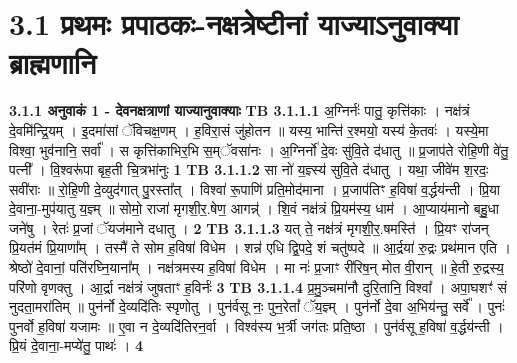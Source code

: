 \documentclass[17pt]{extarticle}
\begin{document}
     \section*{ 3.1     प्रथमः प्रपाठकः-नक्षत्रेष्टीनां याज्याऽनुवाक्या ब्राह्मणानि }
                \textbf{ 3.1.1      अनुवाकं   1 - देवनक्षत्राणां याज्यानुवाक्याः} \newline
                                \textbf{ TB 3.1.1.1} \newline
                  अ॒ग्निर्नः॑ पातु॒ कृत्ति॑काः । नक्ष॑त्रं दे॒वमि॑न्द्रि॒यम् । इ॒दमा॑सां ॅविचक्ष॒णम् । ह॒विरा॒सं जु॑होतन ॥ यस्य॒ भान्ति॑ र॒श्मयो॒ यस्य॑ के॒तवः॑ । यस्ये॒मा विश्वा॒ भुव॑नानि॒ सर्वा᳚ । स कृत्ति॑काभिर॒भि स॒म्ॅवसा॑नः । अ॒ग्निर्नो॑ दे॒वः सु॑वि॒ते द॑धातु ॥ प्र॒जाप॑ते रोहि॒णी वे॑तु॒ पत्नी᳚ । वि॒श्वरू॑पा बृह॒ती चि॒त्रभा॑नुः \textbf{ 1} \newline
                  \newline
                                \textbf{ TB 3.1.1.2} \newline
                  सा नो॑ य॒ज्ञ्स्य॑ सुवि॒ते द॑धातु । यथा॒ जीवे॑म श॒रदः॒ सवी॑राः ॥ रो॒हि॒णी दे॒व्युद॑गात् पु॒रस्ता᳚त् । विश्वा॑ रू॒पाणि॑ प्रति॒मोद॑माना । प्र॒जाप॑तिꣳ ह॒विषा॑ व॒र्द्धय॑न्ती । प्रि॒या दे॒वाना॒-मुप॑यातु य॒ज्ञ्म् ॥ सोमो॒ राजा॑ मृगशी॒र॒.षेण॒ आगन्न्॑ । शि॒वं नक्ष॑त्रं प्रि॒यम॑स्य॒ धाम॑ । आ॒प्याय॑मानो बहु॒॒धा जने॑षु । रेतः॑ प्र॒जां ॅयज॑माने दधातु । \textbf{ 2} \newline
                  \newline
                                \textbf{ TB 3.1.1.3} \newline
                  यत् ते॒ नक्ष॑त्रं मृगशी॒॒र॒.षमस्ति॑ । प्रि॒यꣳ रा॑जन् प्रि॒यत॑मं प्रि॒याणा᳚म् । तस्मै॑ ते सोम ह॒विषा॑ विधेम । शन्न॑ एधि द्वि॒पदे॒ शं चतु॑ष्पदे ॥ आ॒र्द्रया॑ रु॒द्रः प्रथ॑मान एति । श्रेष्ठो॑ दे॒वानां॒ पति॑रघ्नि॒याना᳚म् । नक्ष॑त्रमस्य ह॒विषा॑ विधेम । मा नः॑ प्र॒जाꣳ री॑रिष॒न् मोत वी॒रान् ॥ हे॒ती रु॒द्रस्य॒ परि॑णो वृणक्तु । आ॒र्द्रा नक्ष॑त्रं जुषताꣳ ह॒विर्नः॑ \textbf{ 3} \newline
                  \newline
                                \textbf{ TB 3.1.1.4} \newline
                  प्र॒मु॒ञ्चमा॑नौ दुरि॒तानि॒ विश्वा᳚ । अपा॒घशꣳ॑ सं नुदता॒मरा॑तिम् ॥ पुन॑र्नो दे॒व्यदि॑तिः स्पृणोतु । पुन॑र्वसू नः॒ पुन॒रेतां᳚ ॅय॒ज्ञ्म् । पुन॑र्नो दे॒वा अ॒भिय॑न्तु॒ सर्वे᳚ । पुनः॑ पुनर्वो ह॒विषा॑ यजामः ॥ ए॒वा न दे॒व्यदि॑तिरन॒र्वा । विश्व॑स्य भ॒र्त्री जग॑तः प्रति॒ष्ठा । पुन॑र्वसू ह॒विषा॑ व॒र्द्धय॑न्ती । प्रि॒यं दे॒वाना॒-मप्ये॑तु॒ पाथः॑ । \textbf{ 4} \newline
\end{document}
